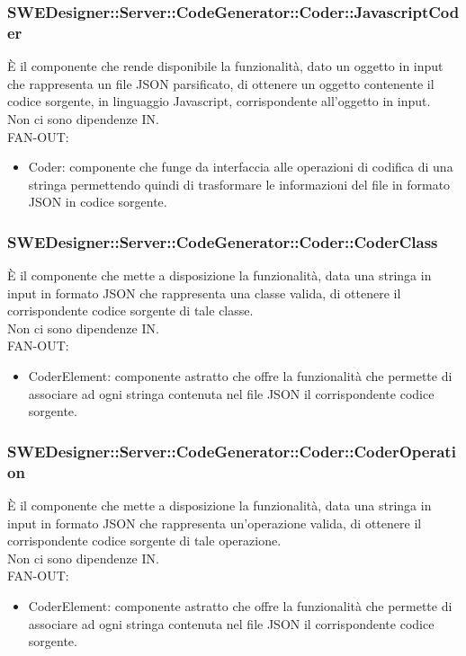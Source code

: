 \documentclass[../DefinizioneDiProdotto.tex]{subfiles}
\begin{document}
				\subsubsection{SWEDesigner::Server::CodeGenerator::Coder::JavascriptCoder}
				È il componente che rende disponibile la funzionalità, dato un oggetto in input che rappresenta un file JSON parsificato, di ottenere un oggetto contenente il codice sorgente, in linguaggio Javascript, corrispondente all'oggetto in input.\\
					Non ci sono dipendenze IN.\\
					FAN-OUT:
					\begin{itemize}
						\item Coder: componente che funge da interfaccia alle operazioni di codifica di una stringa permettendo quindi di trasformare le informazioni del file in formato JSON in codice sorgente.
					\end{itemize}

				\subsubsection{SWEDesigner::Server::CodeGenerator::Coder::CoderClass}
				È il componente che mette a disposizione la funzionalità, data una stringa in input in formato JSON che rappresenta una classe valida, di ottenere il corrispondente codice sorgente di tale classe.\\
					Non ci sono dipendenze IN.\\
					FAN-OUT:
					\begin{itemize}
						\item CoderElement: componente astratto che offre la funzionalità che permette di associare ad ogni stringa contenuta nel file JSON il corrispondente codice sorgente.
					\end{itemize}

				\subsubsection{SWEDesigner::Server::CodeGenerator::Coder::CoderOperation}
				È il componente che mette a disposizione la funzionalità, data una stringa in input in formato JSON che rappresenta un'operazione valida, di ottenere il corrispondente codice sorgente di tale operazione.\\
					Non ci sono dipendenze IN.\\
					FAN-OUT:
					\begin{itemize}
						\item CoderElement: componente astratto che offre la funzionalità che permette di associare ad ogni stringa contenuta nel file JSON il corrispondente codice sorgente.
					\end{itemize}
\end{document}
